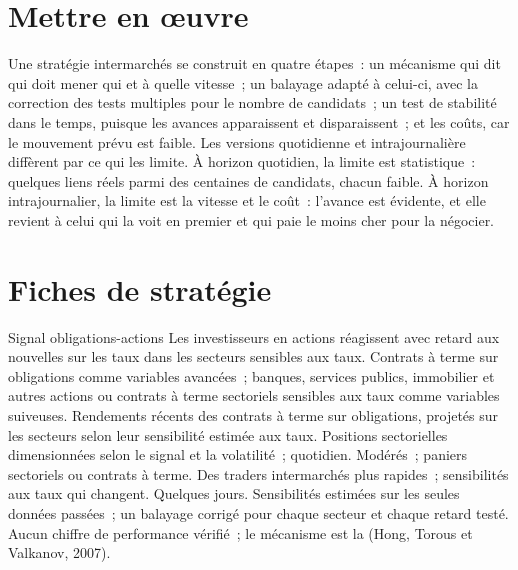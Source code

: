 \section{Mettre en œuvre}

Une stratégie intermarchés se construit en quatre étapes~: un mécanisme qui dit qui doit mener qui et à quelle vitesse~; un balayage adapté à celui-ci, avec la
correction des tests multiples pour le nombre de candidats~; un test de stabilité dans le temps, puisque les avances apparaissent et disparaissent~; et les coûts, car le
mouvement prévu est faible. Les versions quotidienne et intrajournalière diffèrent par ce qui les limite. À horizon quotidien, la limite est statistique~: quelques liens réels parmi
des centaines de candidats, chacun faible. À horizon intrajournalier, la limite est la vitesse et le coût~: l'avance est évidente, et elle revient à celui qui la voit en premier
et qui paie le moins cher pour la négocier.

\section{Fiches de stratégie}

\begin{strategyfile}{Signal obligations-actions}\label{strat:s1:cross-asset-lead-lag:bond}
 Les investisseurs en actions réagissent avec retard aux nouvelles sur les taux dans les secteurs sensibles aux taux.
 Contrats à terme sur obligations comme variables avancées~; banques, services publics, immobilier et autres actions ou contrats à terme sectoriels sensibles aux taux comme variables suiveuses.
 Rendements récents des contrats à terme sur obligations, projetés sur les secteurs selon leur sensibilité estimée aux taux.
 Positions sectorielles dimensionnées selon le signal et la volatilité~; quotidien.
 Modérés~; paniers sectoriels ou contrats à terme.
 Des traders intermarchés plus rapides~; sensibilités aux taux qui changent.
 Quelques jours.
 Sensibilités estimées sur les seules données passées~; un balayage corrigé pour chaque secteur et chaque retard testé.
 Aucun chiffre de performance vérifié~; le mécanisme est la  (Hong, Torous et Valkanov, 2007).
\end{strategyfile}

